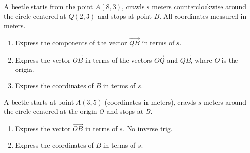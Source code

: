 \documentclass{ximera}
\begin{document}
\begin{question}  \label{QDfgegsE}
A beetle starts from the point $A(8,3)$, crawls $s$ meters counterclockwise around the circle centered at $Q(2,3)$ and stops at point $B$. All coordinates measured in meters.

\begin{enumerate}
\item Express the components of the vector $\overrightarrow{QB}$ in terms of $s$.

\item Express the vector $\overrightarrow{OB}$ in terms of the vectors $\overrightarrow{OQ}$ and $\overrightarrow{QB}$, where $O$ is the origin.

\item Express the coordinates of $B$ in terms of $s$.
\end{enumerate}
\end{question}


\begin{question} \label{QIDIFDfeD}
A beetle starts at point $A(3,5)$ (coordinates in meters), crawls $s$ meters around the circle centered at the origin $O$ and stops at $B$.

\begin{enumerate}
\item Express the vector $\overrightarrow{OB}$ in terms of $s$. No inverse trig.

\item Express the coordinates of $B$ in terms of $s$.
\end{enumerate}
\end{question}
\end{document}
